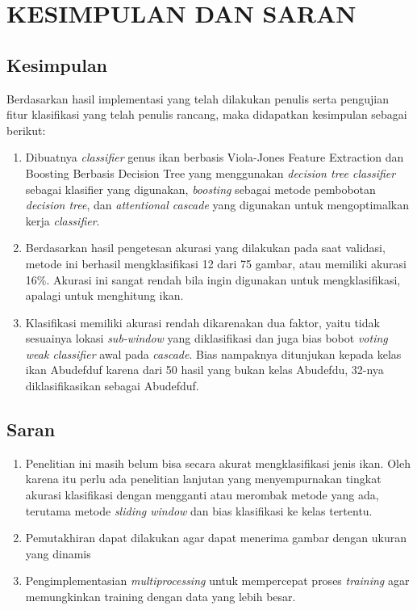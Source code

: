 
\chapter{KESIMPULAN DAN SARAN}

\section{Kesimpulan}
Berdasarkan hasil implementasi yang telah dilakukan penulis serta pengujian fitur klasifikasi yang 
telah penulis rancang, maka didapatkan kesimpulan sebagai berikut:

\begin{enumerate}
	\item Dibuatnya \textit{classifier} genus ikan berbasis Viola-Jones Feature Extraction dan Boosting
	Berbasis Decision Tree yang menggunakan \emph{decision tree classifier} 
	sebagai klasifier yang digunakan, \emph{boosting} sebagai metode pembobotan 
	\emph{decision tree}, dan 
	\emph{attentional cascade} yang digunakan untuk mengoptimalkan kerja \emph{classifier}.

	\item Berdasarkan hasil pengetesan akurasi yang dilakukan pada saat validasi, metode ini 
	berhasil mengklasifikasi 12 dari 75 gambar, atau memiliki akurasi 16\%. Akurasi ini 
	sangat rendah bila ingin digunakan untuk mengklasifikasi, apalagi untuk menghitung ikan.

	\item Klasifikasi memiliki akurasi rendah dikarenakan dua faktor, yaitu tidak 
	sesuainya lokasi \emph{sub-window} yang diklasifikasi dan juga bias bobot \textit{voting} 
	\emph{weak classifier} awal pada \emph{cascade}. Bias nampaknya ditunjukan kepada kelas 
	ikan Abudefduf karena dari 50 hasil yang bukan kelas Abudefdu, 32-nya diklasifikasikan 
	sebagai Abudefduf.

\end{enumerate}

\section{Saran}
\begin{enumerate}
	\item Penelitian ini masih belum bisa secara akurat mengklasifikasi jenis ikan. Oleh 
	karena itu perlu ada penelitian lanjutan yang menyempurnakan tingkat akurasi klasifikasi 
	dengan mengganti atau merombak metode yang ada, terutama metode \emph{sliding window} 
	dan bias klasifikasi ke kelas tertentu.
	\item Pemutakhiran dapat dilakukan agar dapat menerima gambar dengan ukuran yang 
	dinamis 
	\item Pengimplementasian \textit{multiprocessing} untuk mempercepat proses 
	\textit{training} agar memungkinkan training dengan data yang lebih besar.
\end{enumerate}

\begin{comment}

\end{comment}
